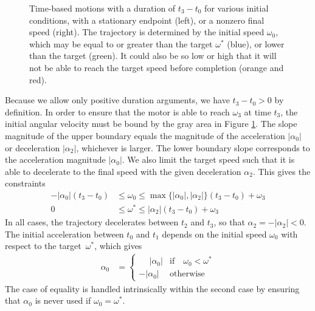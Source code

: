 \documentclass[12pt, a4paper]
{article}
\providecommand{\lr}[1]{\left(#1\right)}
\providecommand{\w}{\omega}
\providecommand{\wt}{\w^*}
\renewcommand{\a}{\alpha}
\providecommand{\w}{\omega}
\providecommand{\abs}[1]{\left|#1\right|}
\begin{document}
\begin{figure}[H]
    \centering
    
    \caption{
        Time-based motions with a duration of $t_3-t_0$ for various initial
        conditions, with a stationary endpoint (left), or a nonzero final speed
        (right). The trajectory is determined by the initial speed $\w_0$,
        which may be equal to or greater than the target $\wt$ (blue),
        or lower than the target (green). It could also be so low or high that
        it will not be able to reach the target speed before completion
        (orange and red).\label{fig:time}}
\end{figure}

Because we allow only positive duration arguments, we have $t_3-t_0 > 0$ by
definition. In order to ensure that the motor is able to reach $\w_3$ at time
$t_3$, the initial angular velocity must be bound by the gray area in Figure
\ref{fig:time}. The slope magnitude of the upper boundary equals the magnitude
of the acceleration $\abs{\a_0}$ or deceleration $\abs{\a_2}$, whichever is
larger. The lower boundary slope corresponds to the acceleration magnitude
$\abs{\a_0}$. We also limit the target speed such that it is able to
decelerate to the final speed with the given deceleration $\a_2$. This gives
the constraints
%
\begin{align}
    -\abs{\a_0} \lr{t_3-t_0} &\leq \w_0 \leq \max \{\abs{\a_0}, \abs{\a_2}\} \lr{t_3-t_0} + \w_3\label{eq:t:timeboundary1}\\[1em]
    0 &\leq \wt \leq \abs{\a_2} \lr{t_3-t_0} + \w_3\nonumber
\end{align}
%
In all cases, the trajectory decelerates between $t_2$ and $t_3$, so that
$\a_2  = - \abs{\a_2} < 0$. The initial acceleration between $t_0$ and $t_1$
depends on the initial speed $\w_0$ with respect to the \mbox{target $\wt$},
which gives
%
\begin{align}
    \label{eq:t:accel0}
    \a_0 &= 
        \begin{cases}
        \phantom{-}\abs{\a_0} & \text{if} \quad \w_0 < \wt\\ 
        -\abs{\a_0} &  \text{otherwise}
        \end{cases}
\end{align}
%
The case of equality is handled intrinsically within the
second case by ensuring that $\a_0$ is never used if $\w_0 = \wt$.
\end{document}
